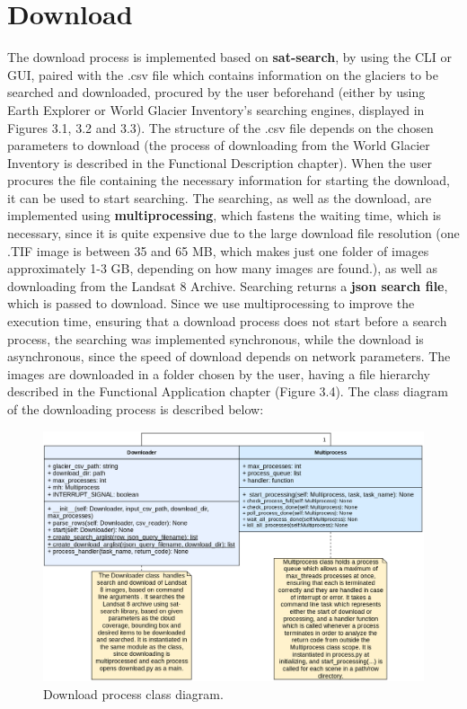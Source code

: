 \documentclass[12pt, a4paper]{report}
\begin{document}
	
	\section{Download}
	The download process is implemented based on \textbf{sat-search}, by using the CLI or GUI, paired with the .csv file which contains information on the glaciers to be searched and downloaded, procured by the user beforehand (either by using Earth Explorer or World Glacier Inventory's searching engines, displayed in Figures 3.1, 3.2 and 3.3). The structure of the .csv file depends on the chosen parameters to download (the process of downloading from the World Glacier Inventory \cite{world_glacier_inventory} is described in the Functional Description chapter). When the user procures the file containing the necessary information for starting the download, it can be used to start searching. The searching, as well as the download, are implemented using \textbf{multiprocessing}, which fastens the waiting time, which is necessary, since it is quite expensive due to the large download file resolution (one .TIF image is between 35 and 65 MB, which makes just one folder of images approximately 1-3 GB, depending on how many images are found.), as well as downloading from the Landsat 8 Archive. Searching returns a \textbf{json search file}, which is passed to download. Since we use multiprocessing to improve the execution time, ensuring that a download process does not start before a search process, the searching was implemented synchronous, while the download is asynchronous, since the speed of download depends on network parameters. The images are downloaded in a folder chosen by the user, having a file hierarchy described in the Functional Application chapter (Figure 3.4). The class diagram of the downloading process is described below: 
	
	\begin{figure}[H]
		\centering
		\includegraphics[scale=1.6]{download_process_class.png}
		\caption{Download process class diagram.}
		\label{fig:download_process_class}
	\end{figure}
\end{document}
